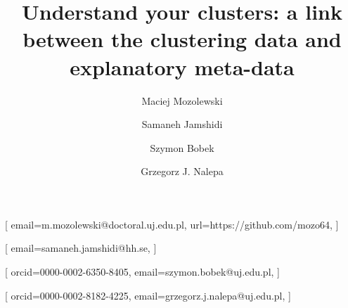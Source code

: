 \documentclass[
 twocolumn,
]{ceurart}
\begin{document}


\title{Understand your clusters: a link between the clustering data and explanatory meta-data}

\tnotemark[1]

\author[1]{Maciej Mozolewski}[%
email=m.mozolewski@doctoral.uj.edu.pl,
url=https://github.com/mozo64,
]

\cormark[1]
\fnmark[1]
\address[1]{Jagiellonian Human-Centered Artificial Intelligence Laboratory (JAHCAI) and Institute of Applied Computer Science, Jagiellonian University, 31-007 Krak\'ow, Poland}



\author[2]{Samaneh Jamshidi}[%
  email=samaneh.jamshidi@hh.se,
]
\address[2]{Center for Applied Intelligent Systems Research (CAISR), Halmstad University, Halmstad, Sweden}

\author[1]{Szymon Bobek}[%
orcid=0000-0002-6350-8405,
email=szymon.bobek@uj.edu.pl,
]

\author[1]{Grzegorz J. Nalepa}[%
orcid=0000-0002-8182-4225,
email=grzegorz.j.nalepa@uj.edu.pl,
]


\end{document}
